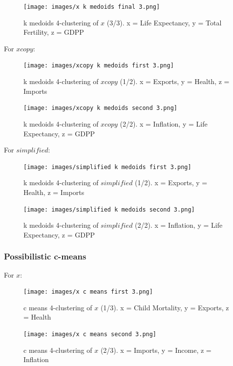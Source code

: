 \documentclass[12pt, a4paper]{article}
\begin{document}
\begin{figure}[H]
    \centering
    \texttt{[image: images/x k medoids final 3.png]}
    \caption{k medoids 4-clustering of $x$ (3/3). x = Life Expectancy, y = Total Fertility, z = GDPP}
    \label{fig:ncopy-optimal}
\end{figure}

For $xcopy$:

\begin{figure}[H]
    \centering
    \texttt{[image: images/xcopy k medoids first 3.png]}
    \caption{k medoids 4-clustering of $xcopy$ (1/2). x = Exports, y = Health, z = Imports}
    \label{fig:ncopy-optimal}
\end{figure}

\begin{figure}[H]
    \centering
    \texttt{[image: images/xcopy k medoids second 3.png]}
    \caption{k medoids 4-clustering of $xcopy$ (2/2). x = Inflation, y = Life Expectancy, z = GDPP}
    \label{fig:ncopy-optimal}
\end{figure}

For $simplified$:

\begin{figure}[H]
    \centering
    \texttt{[image: images/simplified k medoids first 3.png]}
    \caption{k medoids 4-clustering of $simplified$ (1/2). x = Exports, y = Health, z = Imports}
    \label{fig:ncopy-optimal}
\end{figure}

\begin{figure}[H]
    \centering
    \texttt{[image: images/simplified k medoids second 3.png]}
    \caption{k medoids 4-clustering of $simplified$ (2/2). x = Inflation, y = Life Expectancy, z = GDPP}
    \label{fig:ncopy-optimal}
\end{figure}

\subsubsection{Possibilistic c-means}

For $x$:

\begin{figure}[H]
    \centering
    \texttt{[image: images/x c means first 3.png]}
    \caption{c means 4-clustering of $x$ (1/3). x = Child Mortality, y = Exports, z = Health}
    \label{fig:ncopy-optimal}
\end{figure}

\begin{figure}[H]
    \centering
    \texttt{[image: images/x c means second 3.png]}
    \caption{c means 4-clustering of $x$ (2/3). x = Imports, y = Income, z = Inflation}
    \label{fig:ncopy-optimal}
\end{figure}
\end{document}
